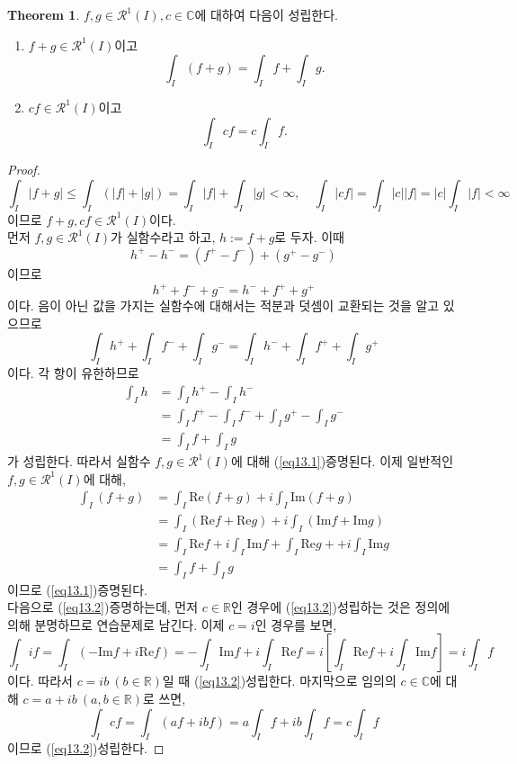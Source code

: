 \documentclass[11pt]{book}
\numberwithin{equation}{chapter}
\def\RR{\mathbb{R}}
\def\CC{\mathbb{C}}
\def\calR{\mathcal{R}}
\newcommand{\abs}[1]{\left\vert#1\right\vert}
\newcommand{\sqbracket}[1]{\left[#1\right]}
\theoremstyle{definition}
\newtheorem{thm}{Theorem}[section]
\newenvironment{enum}
	{\begin{enumerate}[label=(\alph*), leftmargin=2\parindent]}
	{\end{enumerate}}
\begin{document}
\begin{thm}
    \(f, g \in \calR^1(I), c \in \CC\)에 대하여 다음이 성립한다.
    \begin{enum}
        \item \(f + g \in \calR^1(I)\)이고
        \begin{equation} \label{eq13.1}
            \int_I (f+g) = \int_I f + \int_I g.
        \end{equation}
        \item \(cf \in \calR^1(I)\)이고
        \begin{equation} \label{eq13.2}
            \int_I cf = c \int_I f.
        \end{equation}
    \end{enum}
\end{thm}
\begin{proof}
    \[
    \int_I \abs{f+g} \le \int_I (\abs{f}+\abs{g}) = \int_I \abs{f} + \int_I \abs{g} < \infty, \quad \int_I \abs{cf} = \int_I \abs{c}\abs{f} = \abs{c} \int_I \abs{f} < \infty  
    \]
    이므로 \(f+g, cf \in \calR^1(I)\)이다.\\
    먼저 \(f, g \in \calR^1(I)\)가 실함수라고 하고, \(h := f+g\)로 두자. 이때
    \[
    h^+ - h^- = (f^+ - f^-) + (g^+ - g^-)    
    \]
    이므로
    \[
    h^+ + f^- + g^- = h^- + f^+ + g^+
    \]
    이다. 음이 아닌 값을 가지는 실함수에 대해서는 적분과 덧셈이 교환되는 것을 알고 있으므로
    \[
    \int_I h^+ + \int_I f^- + \int_I g^- = \int_I h^- + \int_I f^+ + \int_I g^+  
    \]
    이다. 각 항이 유한하므로
    \begin{align*}
        \int_I h &= \int_I h^+ - \int_I h^-\\
        &= \int_I f^+ - \int_I f^- + \int_I g^+ - \int_I g^-\\
        &= \int_I f + \int_I g
    \end{align*}
    가 성립한다. 따라서 실함수 \(f, g \in \calR^1(I)\)에 대해 (\ref{eq13.1})\이 증명된다. 이제 일반적인 \(f, g \in \calR^1(I)\)에 대해,
    \begin{align*}
        \int_I (f+g) &= \int_I \mathrm{Re}(f+g) + i \int_I \mathrm{Im}(f+g)\\
        &= \int_I (\mathrm{Re}f + \mathrm{Re}g) + i \int_I (\mathrm{Im}f + \mathrm{Im}g)\\
        &= \int_I \mathrm{Re}f + i \int_I \mathrm{Im}f + \int_I \mathrm{Re}g +  + i \int_I \mathrm{Im}g\\
        &= \int_I f + \int_I g
    \end{align*}
    이므로 (\ref{eq13.1})\이 증명된다.\\
    다음으로 (\ref{eq13.2})\를 증명하는데, 먼저 \(c \in \RR\)인 경우에 (\ref{eq13.2})\가 성립하는 것은 정의에 의해 분명하므로 연습문제로 남긴다. 이제 \(c = i\)인 경우를 보면,
    \[
    \int_I if = \int_I (-\mathrm{Im}f + i\mathrm{Re}f) = -\int_I \mathrm{Im}f + i \int_I \mathrm{Re}f = i \sqbracket{\int_I \mathrm{Re}f + i \int_I \mathrm{Im}f} = i \int_I f
    \]
    이다. 따라서 \(c = ib \ (b \in \RR)\)일 때 (\ref{eq13.2})\가 성립한다. 마지막으로 임의의 \(c \in \CC\)에 대해 \(c = a + ib \ (a, b \in \RR)\)로 쓰면,
    \[
        \int_I cf = \int_I (af + ibf) = a\int_I f + ib \int_I f = c \int_I f    
    \]
    이므로 (\ref{eq13.2})\가 성립한다.
\end{proof}
\end{document}
